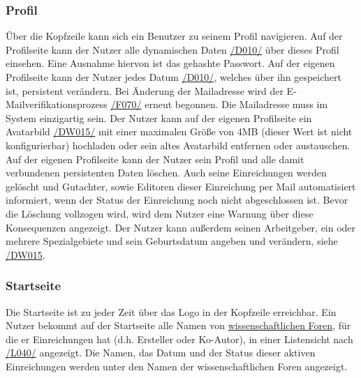 \subsubsection{Profil} \label{nut:profil}
\begin{description}
     Über die Kopfzeile kann sich ein Benutzer zu seinem Profil navigieren.
     Auf der Profilseite kann der Nutzer alle dynamischen Daten \hyperref[d010]{/D010/} über dieses Profil einsehen.
    Eine Ausnahme hiervon ist das gehashte Passwort.
     Auf der eigenen Profilseite kann der Nutzer jedes Datum \hyperref[d010]{/D010/},
    welches über ihn gespeichert ist, persistent verändern.
     Bei Änderung der Mailadresse wird der E-Mailverifikationsprozess \hyperref[funkt:070]{/F070/} erneut
    begonnen. Die Mailadresse muss im System einzigartig sein.
     Der Nutzer kann auf der eigenen Profilseite ein Avatarbild \hyperref[d015]{/DW015/} mit einer maximalen
    Größe von 4MB (dieser Wert ist nicht konfigurierbar) hochladen oder sein altes Avatarbild entfernen oder austauschen.
     Auf der eigenen Profilseite kann der Nutzer sein Profil und alle damit verbundenen persistenten
    Daten löschen. Auch seine Einreichungen werden gelöscht und Gutachter, sowie Editoren dieser
    Einreichung per Mail automatisiert informiert, wenn der Status der Einreichung noch nicht abgeschlossen ist.
    Bevor die Löschung vollzogen wird, wird dem Nutzer eine Warnung über diese Konsequenzen angezeigt.
     Der Nutzer kann außerdem seinen Arbeitgeber, ein oder mehrere Spezialgebiete
    und sein Geburtsdatum angeben und verändern, siehe \hyperref[d015]{/DW015}.
\end{description}

\subsubsection{Startseite} \label{nut:start}
\begin{description}
     Die Startseite ist zu jeder Zeit über das Logo in der Kopfzeile erreichbar.
     Ein Nutzer bekommt auf der Startseite alle Namen von \hyperref[glo:wissForum]{wissenschaftlichen Foren},
    für die er Einreichungen hat (d.h. Ersteller oder Ko-Autor), in einer Listensicht nach \hyperref[leist:40]{/L040/} angezeigt.
    Die Namen, das Datum und der Status dieser aktiven Einreichungen werden unter den Namen der wissenschaftlichen
    Foren angezeigt.
\end{description}

